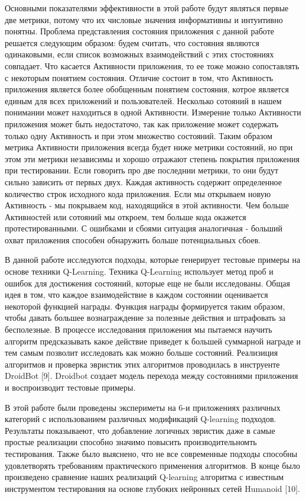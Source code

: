 Основными показателями эффективности в этой работе будут являться первые две метрики, потому что их числовые значения информативны и интуитивно понятны. Проблема представления состояния приложения с данной работе решается следующим образом: будем считать, что состояния являются одинаковыми, если список возможных взаимодействий с этих стостояниях совпадает. Что касается Активности приложения, то ее тоже можно сопоставлять с некоторым понятием состояния. Отличие состоит в том, что Активность приложения является более обобщенным понятием состояния, котрое является единым для всех приложений и пользователей. Несколько сотояний в нашем понимании может находиться в одной Активности. Измерение только Активности приложения может быть недостаточо, так как приложение может содержать только одну Активность и при этом множество состояний. Таким образом метрика Активности приложения всегда будет ниже метрики состояний, но при этом эти метрики независимы и хорошо отражают степень покрытия приложения при тестировании. Если говорить про две последнии метрики, то они будут сильно зависить от первых двух. Каждая активность содержит определенное количество строк исходного кода приложения. Если мы открываем новую Активность - мы покрываем код, находящийся в этой активности. Чем больше Активностей или сотояний мы откроем, тем больше кода окажется протестированными. С ошибками и сбоями ситуация аналогичная - больший охват приложения способен обнаружить больше потенциальных сбоев.

В данной работе исследуются подходы, которые генерирует тестовые примеры на основе техники Q-Learning. Техника Q-Learning использует метод проб и ошибок для достижения состояний, которые еще не были исследованы. Общая идея в том, что каждое взаимодействие в каждом состоянии оценивается некоторой функцией награды. Функция награды формируется таким образом, чтобы давать большее вознаграждение за полезные действия и штрафовать за бесполезные. В процессе исследования приложения мы пытаемся научить алгоритм предсказывать какое действие приведет к большей суммарной награде и тем самым позволит исследовать как можно больше состояний.  Реализиция алгоритмов и проверка эвристик этих алгоритмов проводилась в инструенте DroidBot [9]. Droidbot создает модель перехода между состояниями приложения и воспроизводит тестовые примеры.

В этой работе были проведены экспериметы на 6-и приложениях различных категорий с использованием различных модификаций Q-learning подходов. Результаты показываеют, что добавление логичных эвристик даже в самые простые реализации способно значимо повысить производительномть тестирования. Также было выяснено, что не все современные подходы способны удовлетворять требованиям практического применения алгоритмов. В конце было произведено сравнение наших реализаций Q-learning алгоритма с известным инструментом тестирования на основе глубоких нейронных сетей Humanoid [10].  